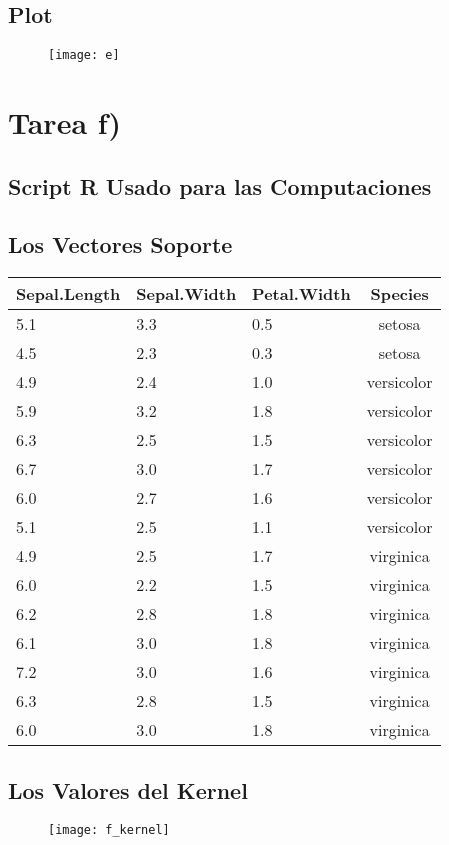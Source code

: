 \documentclass[fleqn]{llncs}
\begin{document}
\subsection{Plot}
\begin{figure}[H]
	\centering
	\texttt{[image: e]}
\end{figure}

\newpage

\section{Tarea f)}

\subsection{Script R Usado para las Computaciones}


\newpage

\subsection{Los Vectores Soporte}
\begin{tabular}{l l l c}
	Sepal.Length & Sepal.Width & Petal.Width & Species \\
	\hline
	5.1 & 3.3 & 0.5 & setosa \\
	4.5 & 2.3 & 0.3 & setosa \\
	4.9 & 2.4 & 1.0 & versicolor \\
	5.9 & 3.2 & 1.8 & versicolor \\
	6.3 & 2.5 & 1.5 & versicolor \\
	6.7 & 3.0 & 1.7 & versicolor \\
	6.0 & 2.7 & 1.6 & versicolor \\
	5.1 & 2.5 & 1.1 & versicolor \\
	4.9 & 2.5 & 1.7 & virginica \\
	6.0 & 2.2 & 1.5 & virginica \\
	6.2 & 2.8 & 1.8 & virginica \\
	6.1 & 3.0 & 1.8 & virginica \\
	7.2 & 3.0 & 1.6 & virginica \\
	6.3 & 2.8 & 1.5 & virginica \\
	6.0 & 3.0 & 1.8 & virginica \\
\end{tabular}

\subsection{Los Valores del Kernel}
\begin{figure}[H]
	\centering
	\texttt{[image: f\_kernel]}
\end{figure}
\end{document}
